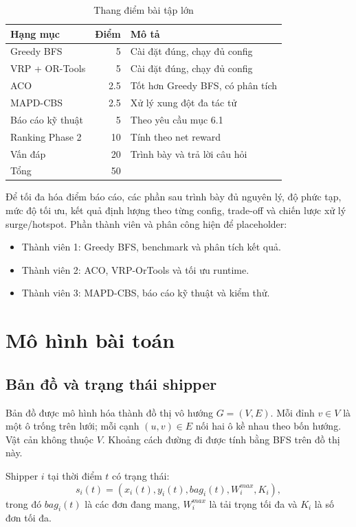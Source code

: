 \documentclass[conference]{IEEEtran}
\begin{document}
\begin{table}[t]
\centering
\caption{Thang điểm bài tập lớn}
\label{tab:rubric}
\begin{tabular}{lrl}
\toprule
Hạng mục & Điểm & Mô tả \\
\midrule
Greedy BFS & 5 & Cài đặt đúng, chạy đủ config \\
VRP + OR-Tools & 5 & Cài đặt đúng, chạy đủ config \\
ACO & 2.5 & Tốt hơn Greedy BFS, có phân tích \\
MAPD-CBS & 2.5 & Xử lý xung đột đa tác tử \\
Báo cáo kỹ thuật & 5 & Theo yêu cầu mục 6.1 \\
Ranking Phase 2 & 10 & Tính theo net reward \\
Vấn đáp & 20 & Trình bày và trả lời câu hỏi \\
\midrule
Tổng & 50 & \\
\bottomrule
\end{tabular}
\end{table}

Để tối đa hóa điểm báo cáo, các phần sau trình bày đủ nguyên lý, độ phức tạp, mức độ tối ưu, kết quả định lượng theo từng config, trade-off và chiến lược xử lý surge/hotspot. Phần thành viên và phân công hiện để placeholder:
\begin{itemize}
    \item Thành viên 1: Greedy BFS, benchmark và phân tích kết quả.
    \item Thành viên 2: ACO, VRP-OrTools và tối ưu runtime.
    \item Thành viên 3: MAPD-CBS, báo cáo kỹ thuật và kiểm thử.
\end{itemize}

\section{Mô hình bài toán}
\subsection{Bản đồ và trạng thái shipper}
Bản đồ được mô hình hóa thành đồ thị vô hướng $G=(V,E)$. Mỗi đỉnh $v \in V$ là một ô trống trên lưới; mỗi cạnh $(u,v) \in E$ nối hai ô kề nhau theo bốn hướng. Vật cản không thuộc $V$. Khoảng cách đường đi được tính bằng BFS trên đồ thị này.

Shipper $i$ tại thời điểm $t$ có trạng thái:
\begin{equation}
s_i(t) = (x_i(t), y_i(t), bag_i(t), W_i^{max}, K_i),
\end{equation}
trong đó $bag_i(t)$ là các đơn đang mang, $W_i^{max}$ là tải trọng tối đa và $K_i$ là số đơn tối đa.
\end{document}
